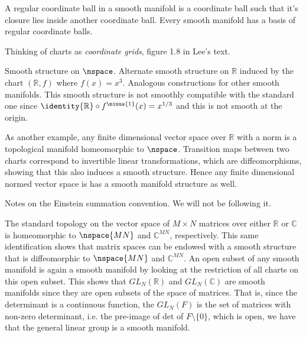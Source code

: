     \par\hfill\par
    A regular coordinate ball in a smooth manifold is a coordinate ball such
    that it's closure lies inside another coordinate ball. Every smooth
    manifold has a basis of regular coordinate balls.
    \par\hfill\par
    Thinking of charts as \textit{coordinate grids}, figure 1.8 in Lee's text.
    \begin{example}
        Smooth structure on $\nspace$. Alternate smooth structure on
        $\mathbb{R}$ induced by the chart $(\mathbb{R},f)$ where $f(x)=x^{3}$.
        Analogous constructions for other smooth manifolds. This smooth
        structure is not smoothly compatible with the standard one since
        $\identity{\mathbb{R}}\circ{f}^{\minus{1}}(x)=x^{1/3}$ and this is not
        smooth at the origin.
    \end{example}
    As another example, any finite dimensional vector space over $\mathbb{R}$
    with a norm is a topological manifold homeomorphic to $\nspace$.
    Transition maps between two charts correspond to invertible linear
    transformations, which are diffeomorphisms, showing that this also induces
    a smooth structure. Hence any finite dimensional normed vector space is has
    a smooth manifold structure as well.
    \par\hfill\par
    Notes on the Einstein summation convention. We will not be following it.
    \par\hfill\par
    The standard topology on the vector space of $M\times{N}$ matrices over
    either $\mathbb{R}$ or $\mathbb{C}$ is homeomorphic to $\nspace{MN}$ and
    $\mathbb{C}^{MN}$, respectively. This same identification shows that matrix
    spaces can be endowed with a smooth structure that is diffeomorphic to
    $\nspace{MN}$ and $\mathbb{C}^{MN}$. An open subset of any smooth manifold
    is again a smooth manifold by looking at the restriction of all charts on
    this open subset. This shows that $GL_{N}(\mathbb{R})$ and
    $GL_{N}(\mathbb{C})$ are smooth manifolds since they are open subsets of
    the space of matrices. That is, since the determinant is a continuous
    function, the $GL_{N}(F)$ is the set of matrices with non-zero determinant,
    i.e. the pre-image of $\textrm{det}$ of $F\setminus\{0\}$, which is open,
    we have that the general linear group is a smooth manifold.
    \par\hfill\par
